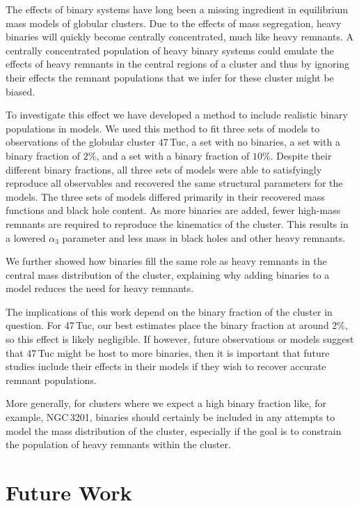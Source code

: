 
The effects of binary systems have long been a missing ingredient in equilibrium mass models of
globular clusters. Due to the effects of mass segregation, heavy binaries will quickly become
centrally concentrated, much like heavy remnants. A centrally concentrated population of heavy
binary systems could emulate the effects of heavy remnants in the central regions of a cluster and
thus by ignoring their effects the remnant populations that we infer for these cluster might be
biased.

To investigate this effect we have developed a method to include realistic binary populations in
 models. We used this method to fit three sets of models to observations of the
globular cluster 47\,Tuc, a set with no binaries, a set with a binary fraction of $2\%$, and a set
with a binary fraction of $10\%$. Despite their different binary fractions, all three sets of models
were able to satisfyingly reproduce all observables and recovered the same structural parameters for
the models. The three sets of models differed primarily in their recovered mass functions and black
hole content. As more binaries are added, fewer high-mass remnants are required to reproduce the
kinematics of the cluster. This results in a lowered $\alpha_3$ parameter and less mass in black
holes and other heavy remnants.

We further showed how binaries fill the same role as heavy remnants in the central mass distribution
of the cluster, explaining why adding binaries to a model reduces the need for heavy remnants.

The implications of this work depend on the binary fraction of the cluster in question. For 47\,Tuc,
our best estimates place the binary fraction at around $2\%$, so this effect is likely negligible.
If however, future observations or models suggest that 47\,Tuc might be host to more binaries, then
it is important that future studies include their effects in their models if they wish to recover
accurate remnant populations.


More generally, for clusters where we expect a high binary fraction like, for example, NGC\,3201,
binaries should certainly be included in any attempts to model the mass distribution of the cluster,
especially if the goal is to constrain the population of heavy remnants within the cluster.



\section{Future Work}



